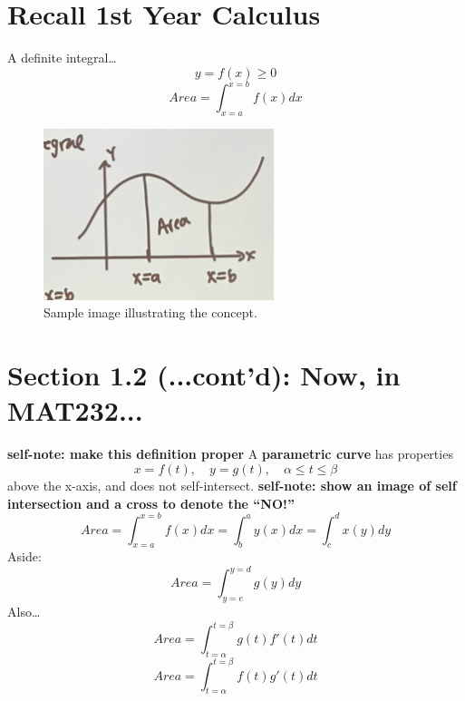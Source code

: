 \documentclass{article}
\begin{document}
\section*{Recall 1st Year Calculus}
\begin{definitionbox}
A definite integral\dots
\[
    y = f(x) \geq 0
\]
\[
    Area = \int_{x=a}^{x=b} f(x) dx
\]
\end{definitionbox}
\begin{figure}[H]
    \centering
    \includegraphics[width=0.6\textwidth]{1styearcalc.jpg}
    \caption{Sample image illustrating the concept.}
    \label{fig:sample_image}
\end{figure}

\section*{Section 1.2 (...cont'd): Now, in MAT232...}
\begin{definitionbox}
    \textbf{self-note: make this definition proper}
    A \textbf{parametric curve} has properties
    \[
        x = f(t), \quad y = g(t), \quad \alpha \leq t \leq \beta
    \]
    above the x-axis, and does not self-intersect.
    \textbf{self-note: show an image of self intersection and a cross to denote the ``NO!''}
    \[
        Area = \int_{x=a}^{x=b} f(x) dx = \int_{b}^{a} y(x) dx = \int_{c}^{d} x(y) dy
    \]
    Aside:
    \[
        Area = \int_{y=e}^{y=d} g(y) dy
    \]
    Also\dots
    \[
        Area = \int_{t=\alpha}^{t=\beta} g(t) f'(t) dt
    \]
    \[
        Area = \int_{t=\alpha}^{t=\beta} f(t) g'(t) dt
    \]
\end{definitionbox}
\end{document}
